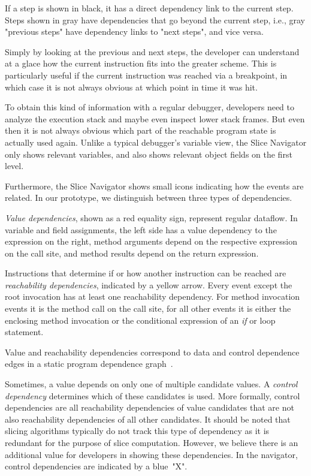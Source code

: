 \documentclass[
			english,
			review,
			]{elsarticle}
\begin{document}
If a step is shown in black, it has a direct dependency link to the current step.
Steps shown in gray have dependencies that go beyond the current step, i.e., gray "previous steps" have dependency links to "next steps", and vice versa.

Simply by looking at the previous and next steps, the developer can understand at a glace how the current instruction fits into the greater scheme.
This is particularly useful if the current instruction was reached via a breakpoint, in which case it is not always obvious at which point in time it was hit.

To obtain this kind of information with a regular debugger, developers need to analyze the execution stack and maybe even inspect lower stack frames.
But even then it is not always obvious which part of the reachable program state is actually used again.
Unlike a typical debugger's variable view, the Slice Navigator only shows relevant variables, and also shows relevant object fields on the first level.

Furthermore, the Slice Navigator shows small icons indicating how the events are related.
In our prototype, we distinguish between three types of dependencies.

\emph{Value dependencies}, shown as a red equality sign, represent regular dataflow.
In variable and field assignments, the left side has a value dependency to the expression on the right, method arguments depend on the respective expression on the call site, and method results depend on the return expression.

Instructions that determine if or how another instruction can be reached are \emph{reachability dependencies}, indicated by a yellow arrow.
Every event except the root invocation has at least one reachability dependency.
For method invocation events it is the method call on the call site, for all other events it is either the enclosing method invocation or the conditional expression of an \emph{if} or loop statement.

Value and reachability dependencies correspond to data and control dependence edges in a static program dependence graph~\cite{agrawal_dynamic_1990}.

Sometimes, a value depends on only one of multiple candidate values. 
A \emph{control dependency} determines which of these candidates is used.
More formally, control dependencies are all reachability dependencies of value candidates that are not also reachability dependencies of all other candidates.
It should be noted that slicing algorithms typically do not track this type of dependency as it is redundant for the purpose of slice computation.
However, we believe there is an additional value for developers in showing these dependencies.
In the navigator, control dependencies are indicated by a blue~"X".
\end{document}
